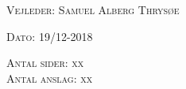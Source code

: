 \begin{center}
\begin{center}
\begin{tabular}{l c r}
			
		\end{tabular}
	\end{center}
	\vspace{0.5 in}
	
	\textsc{\large Vejleder: Samuel Alberg Thrysøe}
	\vspace{0.5 in}
	
	\textsc{\large Dato: 19/12-2018}\\
	\vspace{0.5 in}
	

\textsc{Antal sider: xx} \\
\textsc{Antal anslag: xx} \\
\vfill %
	
\end{center} %

\clearpage

\newpage